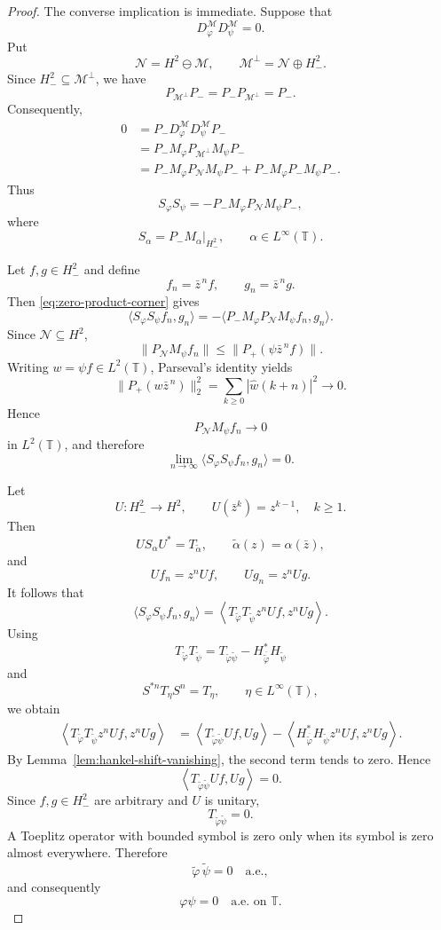 \documentclass[12pt]{amsart}
\theoremstyle{definition}
\theoremstyle{remark}
\def \T{\mathbb{T}}
\newcommand{\clm}{\mathcal{M}}
\newcommand{\cln}{\mathcal{N}}
\newcommand{\vp}{\varphi}
\numberwithin{equation}{section}
\begin{document}
\begin{proof}
The converse implication is immediate. Suppose that
\[
D_\vp^\clm D_\psi^\clm=0.
\]
Put
\[
\cln=H^2\ominus\clm,
\qquad
\clm^\perp=\cln\oplus H_{-}^2.
\]
Since $H_{-}^2\subseteq\clm^\perp$, we have
\[
P_{\clm^\perp}P_-=P_-P_{\clm^\perp}=P_-.
\]
Consequently,
\begin{align*}
0
&=
P_-D_\vp^\clm D_\psi^\clm P_- \\
&=
P_-M_\vp P_{\clm^\perp}M_\psi P_- \\
&=
P_-M_\vp P_\cln M_\psi P_-
+
P_-M_\vp P_-M_\psi P_-.
\end{align*}
Thus
\begin{equation}\label{eq:zero-product-corner}
S_\vp S_\psi = - P_-M_\vp P_\cln M_\psi P_-,
\end{equation}
where
\[
S_\alpha=P_-M_\alpha\big|_{H_{-}^2}, \qquad \alpha\in L^\infty(\T).
\]

Let $f,g\in H_{-}^2$ and define
\[
f_n=\bar z^{\,n}f, \qquad g_n=\bar z^{\,n}g.
\]
Then \eqref{eq:zero-product-corner} gives
\[
\langle S_\vp S_\psi f_n,g_n\rangle
= - \langle P_-M_\vp P_\cln M_\psi f_n,g_n\rangle.
\]
Since $\cln\subseteq H^2$,
\[
\|P_\cln M_\psi f_n\| \leq \|P_+(\psi\bar z^{\,n}f)\|.
\]
Writing $w=\psi f\in L^2(\T)$, Parseval's identity yields
\[
\|P_+(w\bar z^{\,n})\|_2^2
= \sum_{k\geq0}|\widehat w(k+n)|^2
\longrightarrow0.
\]
Hence
\[
P_\cln M_\psi f_n\longrightarrow0
\]
in $L^2(\T)$, and therefore
\[
\lim_{n\to\infty}
\langle S_\vp S_\psi f_n,g_n\rangle = 0.
\]

Let
\[
U:H_{-}^2\to H^2, \qquad U(\bar z^k)=z^{k-1},
\quad k\geq1.
\]
Then
\[
US_\alpha U^*=T_{\widetilde\alpha},
\qquad \widetilde\alpha(z)=\alpha(\bar z),
\]
and
\[
Uf_n=z^nUf, \qquad Ug_n=z^nUg.
\]
It follows that
\[
\langle S_\vp S_\psi f_n,g_n\rangle
=
\left\langle
T_{\widetilde\vp}T_{\widetilde\psi}z^nUf,
z^nUg
\right\rangle.
\]
Using
\[
T_{\widetilde\vp}T_{\widetilde\psi}
=
T_{\widetilde\vp\widetilde\psi}
-
H_{\overline{\widetilde\vp}}^*
H_{\widetilde\psi}
\]
and
\[
S^{*n}T_\eta S^n=T_\eta,
\qquad \eta\in L^\infty(\T),
\]
we obtain
\begin{align*}
\left\langle
T_{\widetilde\vp}T_{\widetilde\psi}z^nUf,
z^nUg \right\rangle
&= \left\langle T_{\widetilde\vp\widetilde\psi}Uf,Ug \right\rangle - \left\langle H_{\overline{\widetilde\vp}}^*
H_{\widetilde\psi}z^nUf, z^nUg \right\rangle.
\end{align*}
By Lemma~\ref{lem:hankel-shift-vanishing}, the second term tends to zero. Hence
\[
\left\langle
T_{\widetilde\vp\widetilde\psi}Uf,
Ug
\right\rangle
=
0.
\]
Since $f,g\in H_{-}^2$ are arbitrary and $U$ is unitary,
\[
T_{\widetilde\vp\widetilde\psi}=0.
\]
A Toeplitz operator with bounded symbol is zero only when its symbol is
zero almost everywhere. Therefore
\[
\widetilde\vp\,\widetilde\psi=0
\quad\text{a.e.},
\]
and consequently
\begin{equation}\label{eq:symbol-product-zero}
\vp\psi=0
\quad\text{a.e. on }\T.
\end{equation}


\end{proof}
\end{document}
